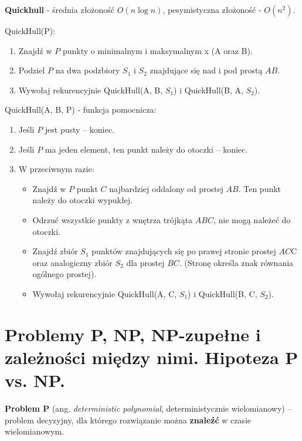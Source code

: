 \documentclass[main.tex]{subfiles}
\begin{document}
    \begin{definition}
        \textbf{Quickhull} - średnia złożoność $O(n \log n)$, pesymistyczna złożoność - $O(n^2)$.

        QuickHull(P):
        \begin{enumerate}
            \item Znajdź w $P$ punkty o minimalnym i maksymalnym x (A oraz B).
            \item Podziel $P$ na dwa podzbiory $S_1$ i $S_2$ znajdujące się nad i pod prostą $AB$.
            \item Wywołaj rekurencyjnie QuickHull(A, B, $S_1$) i QuickHull(B, A, $S_2$).
        \end{enumerate}

        QuickHull(A, B, P) - funkcja pomocnicza:
        \begin{enumerate}
            \item Jeśli $P$ jest pusty – koniec.
            \item Jeśli $P$ ma jeden element, ten punkt należy do otoczki – koniec.
            \item W przeciwnym razie:
            \begin{itemize}
                \item Znajdź w $P$ punkt $C$ najbardziej oddalony od prostej $AB$. Ten punkt należy do otoczki wypukłej.
                \item Odrzuć wszystkie punkty z wnętrza trójkąta $ABC$, nie mogą należeć do otoczki.
                \item Znajdź zbiór $S_1$ punktów znajdujących się po prawej stronie prostej $AC$C oraz analogiczny
                zbiór $S_2$ dla prostej $BC$. (Stronę określa znak równania ogólnego prostej).
                \item Wywołaj rekurencyjnie QuickHull(A, C, $S_1$) i QuickHull(B, C, $S_2$).
            \end{itemize}
        \end{enumerate}
    \end{definition}

    \newpage

    \section{Problemy P, NP, NP-zupełne i zależności między nimi. Hipoteza P vs. NP.}
    \begin{definition}
        \textbf{Problem P} (ang. \textit{deterministic polynomial}, deterministycznie wielomianowy) – problem decyzyjny,
        dla którego rozwiązanie można \textbf{znaleźć} w czasie wielomianowym.
    \end{definition}
\end{document}
